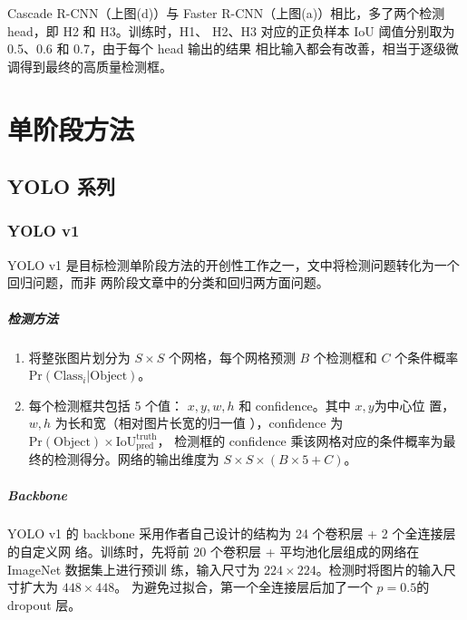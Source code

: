 Cascade R-CNN（上图(d)）与 Faster R-CNN（上图(a)）相比，多了两个检测 head，即 H2 和 H3。训练时，H1、
H2、H3 对应的正负样本 IoU 阈值分别取为 0.5、0.6 和 0.7，由于每个 head 输出的结果
相比输入都会有改善，相当于逐级微调得到最终的高质量检测框。

\chapter{单阶段方法}

\section{YOLO 系列}
\label{sec:YOLO}

\subsection{YOLO v1}
\label{subsec:YOLOv1}
YOLO v1 是目标检测单阶段方法的开创性工作之一，文中将检测问题转化为一个回归问题，而非
两阶段文章中的分类和回归两方面问题。

\paragraph{检测方法}

\begin{enumerate}
  \item 将整张图片划分为 $S \times S$ 个网格，每个网格预测 $ B $ 个检测框和 $ C $
    个条件概率 $ \mathrm{Pr}(\mathrm{Class}_i|\mathrm{Object}) $。
  \item 每个检测框共包括 5 个值： $x, y, w, h$ 和 confidence。其中 $x, y$为中心位
    置，$w, h$ 为长和宽（相对图片长宽的归一值
    ），confidence 为$\mathrm{Pr}(\mathrm{Object}) \times
    \mathrm{IoU}^{\mathrm{truth}}_{\mathrm{pred}}$，
    检测框的 confidence 乘该网格对应的条件概率为最终的检测得分。网络的输出维度为 $ S
    \times S \times (B \times 5 + C) $。
\end{enumerate}

\paragraph{Backbone}

YOLO v1 的 backbone 采用作者自己设计的结构为 24 个卷积层 + 2 个全连接层的自定义网
络。训练时，先将前 20 个卷积层 + 平均池化层组成的网络在 ImageNet 数据集上进行预训
练，输入尺寸为 $224 \times 224$。检测时将图片的输入尺寸扩大为 $448 \times 448$。
为避免过拟合，第一个全连接层后加了一个 $p=0.5$的 dropout 层。

